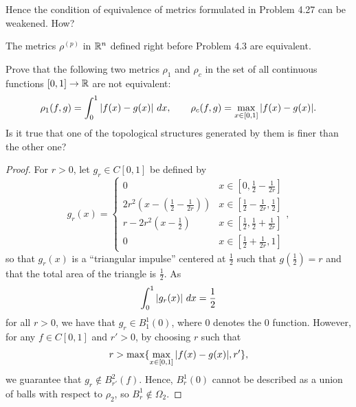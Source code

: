 \begin{minorEx}
    [Riddle]
    Hence the condition of equivalence of metrics formulated in Problem 4.27 can
    be weakened. How?
\end{minorEx}

\begin{minorEx}
    The metrics $\rho^{(p)}$ in $\mathbb{R}^n$ defined right before Problem 4.3 are
    equivalent.
\end{minorEx}

\begin{minorEx}
    Prove that the following two metrics $\rho_1$ and $\rho_c$ in the set of all
    continuous functions $[0,1] \to \mathbb{R}$ are not equivalent:
    \[
        \rho_1(f,g) = \int_{0}^{1} \abs{f(x) - g(x)} \ dx, \qquad
        \rho_c(f,g) = \max_{x \in [0,1]} \abs{f(x) - g(x)}.
    \]
    Is it true that one of the topological structures generated by them is finer
    than the other one?
\end{minorEx}

\begin{proof}
    For $r > 0$, let $g_r \in C[0,1]$ be defined by
    \[
        g_r(x) =
        \begin{cases}
            0 & x \in [0, \tfrac{1}{2} - \tfrac{1}{2r}] \\
            2r^2(x - (\tfrac{1}{2} - \tfrac{1}{2r})) & x \in [\tfrac{1}{2} - \tfrac{1}{2r}, \tfrac{1}{2}] \\
            r - 2r^2(x - \tfrac{1}{2}) & x \in [\tfrac{1}{2},\tfrac{1}{2} + \tfrac{1}{2r}] \\
            0 & x \in [\tfrac{1}{2} + \tfrac{1}{2r}, 1]
        \end{cases},
    \]
    so that $g_r(x)$ is a ``triangular impulse'' centered at $\frac{1}{2}$ such
    that $g(\frac{1}{2}) = r$ and that the total area of the triangle is
    $\frac{1}{2}$.
    As
    \[
        \int_{0}^{1} |g_r(x)| \ dx = \frac{1}{2}
    \]
    for all $r > 0$, we have that $g_r \in B_1^1(0)$, where 0 denotes the 0
    function. However, for any $f \in C[0,1]$ and $r' > 0$, by choosing $r$ such
    that
    \[
        r > \max\{\max_{x \in [0,1]} |f(x) - g(x)|, r'\},
    \]
    we guarantee that $g_r \notin B_{r'}^2(f)$. Hence, $B_r^1(0)$ cannot be
    described as a union of balls with respect to $\rho_2$, so $B_r^1 \notin
    \Omega_2$.
\end{proof}
